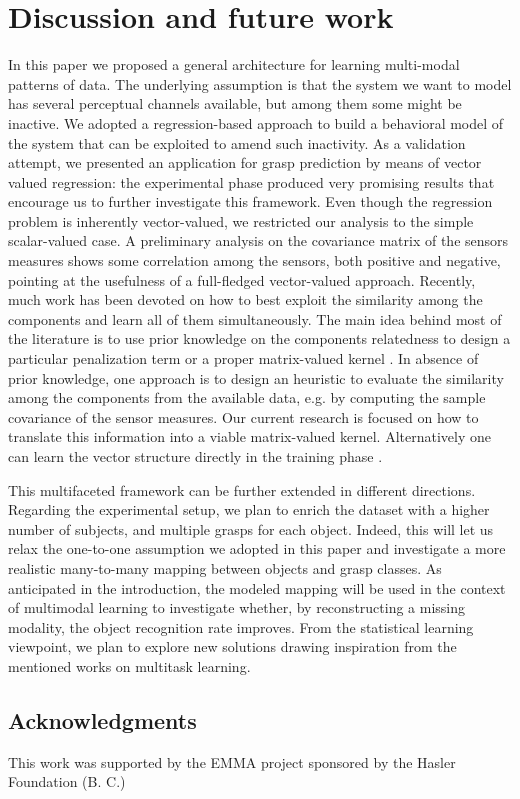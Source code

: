 \section{Discussion and future work}
In this paper we proposed a general architecture for learning multi-modal patterns of data. 
The underlying assumption is that the system we want to model has several perceptual channels available, 
but among them some might be inactive. 
We adopted a regression-based approach to build a behavioral model of the system 
that can be exploited to amend such inactivity.
As a validation attempt, we presented an application for grasp prediction by means of vector 
valued regression: the experimental phase produced very promising results that encourage 
us to further investigate this framework. 
Even though the regression problem is inherently vector-valued, we  restricted 
our analysis to the simple scalar-valued case. 
A preliminary analysis on the covariance matrix of the sensors measures 
shows some correlation among the sensors, both positive and negative, 
pointing at the usefulness of a full-fledged vector-valued approach. 
Recently, much work has been devoted on how to best exploit the similarity among the components 
and learn all of them simultaneously. The main idea behind most of the literature is to use prior 
knowledge on the components relatedness to design a particular penalization term or a proper 
matrix-valued kernel \cite{micchelli04kernels}. 
In absence of prior knowledge, one approach is to design an heuristic to evaluate the similarity 
among the components from the available data, e.g. by computing the sample covariance of the 
sensor measures. 
Our current research is focused on how to translate this information into a viable matrix-valued kernel. 
Alternatively one can learn the vector structure directly in the training phase 
\cite{pontil08transferlearning,jacob08clusteredmtl}.  

This  multifaceted framework can be further extended in different directions. 
Regarding the experimental setup, we plan to enrich the dataset with a higher number of subjects, and multiple grasps for each object. Indeed, this will let us relax the one-to-one assumption we adopted in this paper and investigate a more realistic many-to-many mapping between objects and grasp classes.
As anticipated in the introduction, the modeled mapping will be used in the context of multimodal learning to investigate whether, by reconstructing a missing modality, the object recognition rate improves.
From the statistical learning viewpoint, we plan to explore new solutions drawing inspiration from the mentioned works on multitask learning. 

\subsection*{Acknowledgments}
This work was supported by the EMMA project sponsored by the Hasler Foundation (B. C.)